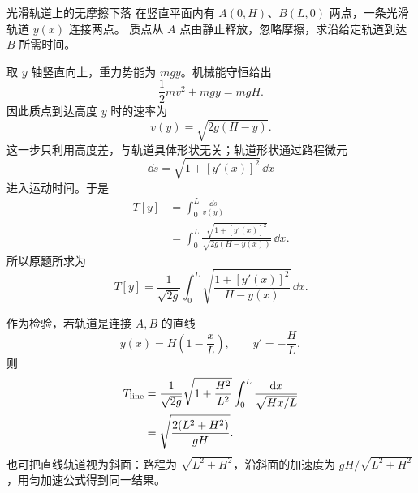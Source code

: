 \documentclass[UTF8,zihao=-4,oneside,openany]{ctexbook}
\begin{document}
\begin{examplebox}{光滑轨道上的无摩擦下落}
在竖直平面内有 $A(0,H)$、$B(L,0)$ 两点，一条光滑轨道 $y(x)$ 连接两点。
质点从 $A$ 点由静止释放，忽略摩擦，求沿给定轨道到达 $B$ 所需时间。

\tcblower
取 $y$ 轴竖直向上，重力势能为 $mgy$。机械能守恒给出
\[
  \frac12mv^2+mgy=mgH.
\]
因此质点到达高度 $y$ 时的速率为
\begin{equation}
  v(y)=\sqrt{2g(H-y)}.
  \label{eq:track-speed}
\end{equation}
这一步只利用高度差，与轨道具体形状无关；轨道形状通过路程微元
\[
  \dd s=\sqrt{1+[y'(x)]^2}\,\dd x
\]
进入运动时间。于是
\begin{align*}
  T[y]
  &=\int_0^L\frac{\dd s}{v(y)}\\
  &=\int_0^L
  \frac{\sqrt{1+[y'(x)]^2}}{\sqrt{2g(H-y(x))}}\,\dd x.
\end{align*}
所以原题所求为
\begin{equation}
  \boxed{T[y]=\frac1{\sqrt{2g}}
  \int_0^L\sqrt{\frac{1+[y'(x)]^2}{H-y(x)}}\,\dd x}.
  \label{eq:gravity-track-time}
\end{equation}

\begin{center}
\end{center}

作为检验，若轨道是连接 $A,B$ 的直线
\[
  y(x)=H\left(1-\frac{x}{L}\right),
  \qquad y'=-\frac HL,
\]
则
\begin{align}
  T_{\mathrm{line}}
  &=\frac1{\sqrt{2g}}\sqrt{1+\frac{H^2}{L^2}}
  \int_0^L\frac{\mathop{}\!\mathrm{d} x}{\sqrt{Hx/L}}\notag\\
  &=\sqrt{\frac{2(L^2+H^2)}{gH}}.
  \label{eq:straight-track-time}
\end{align}
也可把直线轨道视为斜面：路程为 $\sqrt{L^2+H^2}$，沿斜面的加速度为
$gH/\sqrt{L^2+H^2}$，用匀加速公式得到同一结果。
\end{examplebox}
\end{document}
